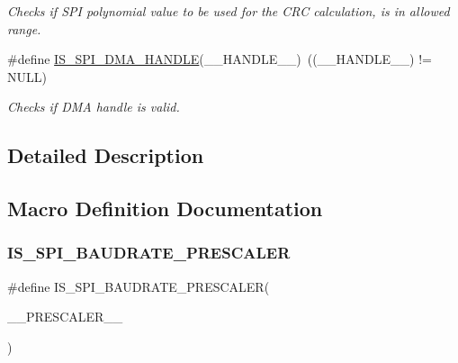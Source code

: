 \begin{DoxyCompactItemize}
\begin{DoxyCompactList}\small\item\em Checks if S\+PI polynomial value to be used for the C\+RC calculation, is in allowed range. \end{DoxyCompactList}\item 
\#define \mbox{\hyperlink{group___s_p_i___private___macros_gae54950bcff11d9165b99957cf8746ae4}{I\+S\+\_\+\+S\+P\+I\+\_\+\+D\+M\+A\+\_\+\+H\+A\+N\+D\+LE}}(\+\_\+\+\_\+\+H\+A\+N\+D\+L\+E\+\_\+\+\_\+)~((\+\_\+\+\_\+\+H\+A\+N\+D\+L\+E\+\_\+\+\_\+) != N\+U\+LL)
\begin{DoxyCompactList}\small\item\em Checks if D\+MA handle is valid. \end{DoxyCompactList}\end{DoxyCompactItemize}


\subsection{Detailed Description}


\subsection{Macro Definition Documentation}
\mbox{\label{group___s_p_i___private___macros_gad15d5bdc7ac1698d1956a25b200e1f25}} 
\subsubsection{\texorpdfstring{IS\_SPI\_BAUDRATE\_PRESCALER}{IS\_SPI\_BAUDRATE\_PRESCALER}}
{\footnotesize\ttfamily \#define I\+S\+\_\+\+S\+P\+I\+\_\+\+B\+A\+U\+D\+R\+A\+T\+E\+\_\+\+P\+R\+E\+S\+C\+A\+L\+ER(\begin{DoxyParamCaption}\item[{}]{\+\_\+\+\_\+\+P\+R\+E\+S\+C\+A\+L\+E\+R\+\_\+\+\_\+ }\end{DoxyParamCaption})}

